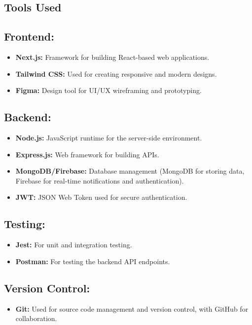 \documentclass[a4paper, 12pt]{article}
\begin{document}
\subsection{ Tools Used}

\subsection*{Frontend:}
\begin{itemize}
    \item \textbf{Next.js:} Framework for building React-based web applications.
    \item \textbf{Tailwind CSS:} Used for creating responsive and modern designs.
    \item \textbf{Figma:} Design tool for UI/UX wireframing and prototyping.
\end{itemize}

\subsection*{Backend:}
\begin{itemize}
    \item \textbf{Node.js:} JavaScript runtime for the server-side environment.
    \item \textbf{Express.js:} Web framework for building APIs.
    \item \textbf{MongoDB/Firebase:} Database management (MongoDB for storing data, Firebase for real-time notifications and authentication).
    \item \textbf{JWT:} JSON Web Token used for secure authentication.
\end{itemize}

\subsection*{Testing:}
\begin{itemize}
    \item \textbf{Jest:} For unit and integration testing.
    \item \textbf{Postman:} For testing the backend API endpoints.
\end{itemize}

\subsection*{Version Control:}
\begin{itemize}
    \item \textbf{Git:} Used for source code management and version control, with GitHub for collaboration.
\end{itemize}
\end{document}
